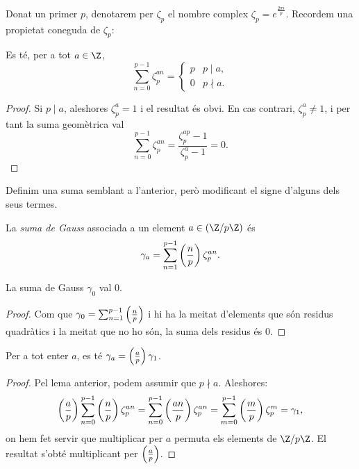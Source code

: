 Donat un primer $p$, denotarem per $\zeta_p$ el nombre complex $\zeta_p=e^{\frac{2\pi i}{p}}$. Recordem una propietat coneguda de $\zeta_p$:

\begin{lemma}
Es té, per a tot $a\in \Z$,
\[
\sum_{n=0}^{p-1} \zeta_p^{an}=\begin{cases}
p& p\mid a,\\
0& p\nmid a.
\end{cases}
\]
\end{lemma}
\begin{proof}
Si $p\mid a$, aleshores $\zeta_p^a=1$ i el resultat és obvi. En cas contrari, $\zeta_p^a\neq 1$, i per tant la suma geomètrica val
\[
\sum_{n=0}^{p-1} \zeta_p^{an} = \frac{\zeta_p^{ap}-1}{\zeta_p^a-1}=0.
\]
\end{proof}

Definim una suma semblant a l'anterior, però modificant el signe d'alguns dels seus termes.
\begin{definition}
 La \emph{suma de Gauss} associada a un element $a\in (\Z/p\Z)$ és
 \[
 \gamma_a = \sum_{n=1}^{p-1}\left(\frac{n}{p}\right) \zeta_p^{an}.
 \]
\end{definition}

\begin{lemma}
La suma de Gauss $\gamma_0$ val $0$.
\end{lemma}
\begin{proof}
Com que $\gamma_0=\sum_{n=1}^{p-1} \left(\frac{n}{p}\right)$ i hi ha la meitat d'elements que són residus quadràtics i la meitat que no ho són, la suma dels residus és $0$.
\end{proof}

\begin{lemma}
Per a tot enter $a$, es té $\gamma_a=\left(\frac{a}{p}\right)\gamma_1$.
\end{lemma}
\begin{proof}
Pel lema anterior, podem assumir que $p\nmid a$. Aleshores:
\[
\left(\frac{a}{p}\right)\sum_{n=0}^{p-1} \left(\frac{n}{p}\right) \zeta_{p}^{an}= \sum_{n=0}^{p-1} \left(\frac{an}{p}\right)\zeta_p^{an} = \sum_{m=0}^{p-1} \left(\frac{m}{p}\right)\zeta_p^m = \gamma_1,
\]
on hem fet servir que multiplicar per $a$ permuta els elements de $\Z/p\Z$. El resultat s'obté multiplicant per $\left(\frac{a}{p}\right)$.
\end{proof}

